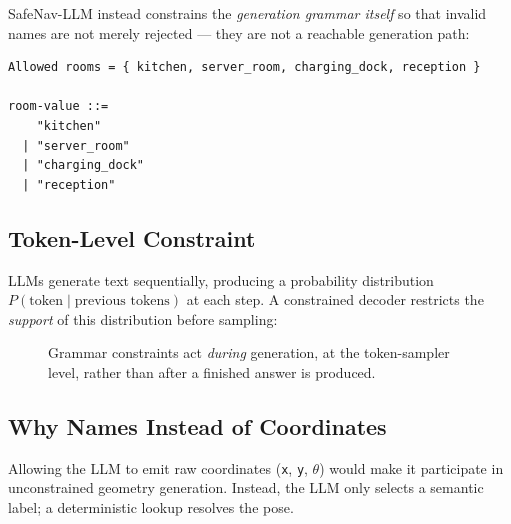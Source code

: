 \documentclass[11pt,a4paper]{article}
\begin{document}
SafeNav-LLM instead constrains the \emph{generation grammar itself} so that
invalid names are not merely rejected --- they are not a reachable generation
path:

\begin{lstlisting}[caption={GBNF-style structural constraint on room values}]
Allowed rooms = { kitchen, server_room, charging_dock, reception }

room-value ::=
    "kitchen"
  | "server_room"
  | "charging_dock"
  | "reception"
\end{lstlisting}

\subsection{Token-Level Constraint}

LLMs generate text sequentially, producing a probability distribution
$P(\text{token}\mid\text{previous tokens})$ at each step. A constrained decoder
restricts the \emph{support} of this distribution before sampling:

\begin{figure}[h]
\centering
{}
\caption{Grammar constraints act \emph{during} generation, at the token-sampler level, rather than after a finished answer is produced.}
\end{figure}

\subsection{Why Names Instead of Coordinates}

Allowing the LLM to emit raw coordinates (\texttt{x}, \texttt{y}, $\theta$)
would make it participate in unconstrained geometry generation. Instead, the
LLM only selects a semantic label; a deterministic lookup resolves the pose.
\end{document}
